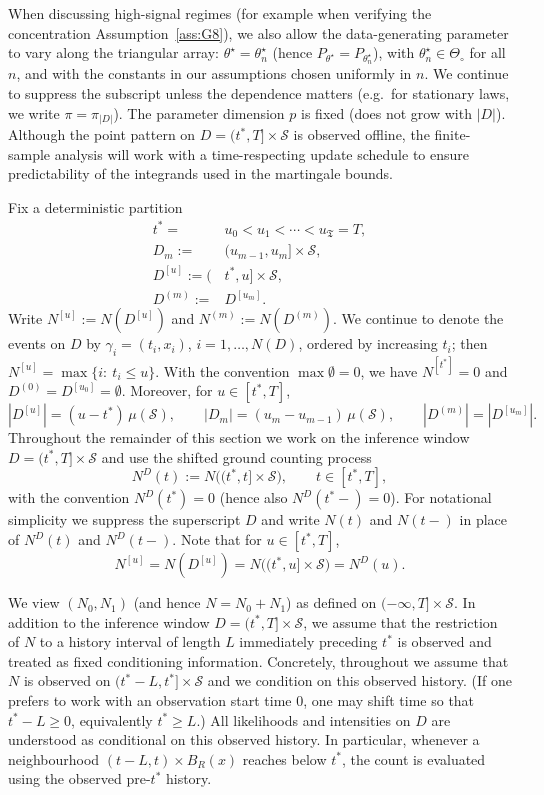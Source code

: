 \documentclass{statsoc}
\newcommand{\1}{\mathbbm{1}}
\newcommand{\Tmax}{\mathfrak{T}}
\begin{document}
When discussing high-signal regimes (for example when verifying the concentration Assumption~\ref{ass:G8}), we also allow the data-generating parameter to vary along the triangular array:
$\theta^\star=\theta^\star_n$ (hence $P_{\theta^\star}=P_{\theta^\star_n}$), with $\theta^\star_n\in\Theta_\circ$ for all $n$, and with the constants in our assumptions chosen uniformly in $n$. We continue to suppress the subscript unless the dependence matters (e.g.\ for stationary laws, we write $\pi=\pi_{|D|}$). The parameter dimension $p$ is fixed (does not grow with $|D|$). Although the point pattern on $D=(t^\ast,T]\times\mathcal S$ is observed offline, the finite-sample analysis will work with a time-respecting update schedule to ensure predictability of the integrands used in the martingale bounds.

Fix a deterministic partition
\begin{align*}
t^\ast=&u_0<u_1<\cdots<u_{\Tmax}=T,\\
D_m:=&(u_{m-1},u_m]\times\mathcal S,\\
D^{[u]}:=(&t^\ast,u]\times\mathcal S,\\
D^{(m)}:=&D^{[u_m]}.
\end{align*}
Write $N^{[u]}:=N(D^{[u]})$ and $N^{(m)}:=N(D^{(m)})$.
We continue to denote the events on $D$ by $\gamma_i=(t_i,x_i)$,
$i=1,\dots,N(D)$, ordered by increasing $t_i$; then $N^{[u]}=\max\{i:\ t_i\le u\}$. With the convention $\max\emptyset=0$, we have $N^{[t^\ast]}=0$ and $D^{(0)}=D^{[u_0]}=\emptyset$.
Moreover, for $u\in[t^\ast,T]$,
\[
|D^{[u]}|=(u-t^\ast)\,\mu(\mathcal S),
\qquad
|D_m|=(u_m-u_{m-1})\,\mu(\mathcal S),
\qquad
|D^{(m)}|=|D^{[u_m]}|.
\]
Throughout the remainder of this section we work on the inference window $D=(t^\ast,T]\times\mathcal S$ and use the shifted ground counting process
\[
N^D(t):=N\big((t^\ast,t]\times\mathcal S\big),\qquad t\in[t^\ast,T],
\]
with the convention $N^D(t^\ast)=0$ (hence also $N^D(t^\ast-)=0$). For notational simplicity we suppress the superscript $D$ and write $N(t)$ and $N(t-)$ in place of $N^D(t)$ and $N^D(t-)$. Note that for $u\in[t^\ast,T]$,
\[
N^{[u]}=N(D^{[u]})=N\big((t^\ast,u]\times\mathcal S\big)=N^D(u).
\]


We view $(N_0,N_1)$ (and hence $N=N_0+N_1$) as defined on $(-\infty,T]\times\mathcal S$.
In addition to the inference window $D=(t^\ast,T]\times\mathcal S$, we assume that the restriction of $N$ to a history interval of length $L$ immediately preceding $t^\ast$ is observed and treated as fixed conditioning information. Concretely, throughout we assume that $N$ is observed on $(t^\ast-L,t^\ast]\times\mathcal S$ and we condition on this observed history. (If one prefers to work with an observation start time $0$, one may shift time so that $t^\ast-L\ge 0$, equivalently $t^\ast\ge L$.) All likelihoods and intensities on $D$ are understood as conditional on this observed history. In particular, whenever a neighbourhood $(t-L,t)\times B_R(x)$ reaches below $t^\ast$, the count is evaluated using the observed pre-$t^\ast$ history.
\end{document}
